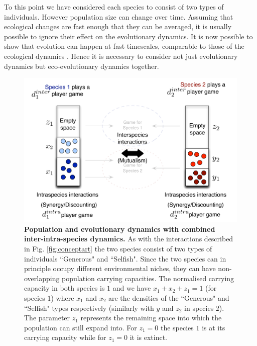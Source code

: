 \documentclass[12pt]{article}
\begin{document}
To this point we have considered each species to consist of two types of individuals. However population size can change over time. Assuming that ecological changes are fast enough that they can be averaged, it is usually possible to ignore their effect on the evolutionary dynamics. It is now possible to show that evolution can happen at fast timescales, comparable to those of the ecological dynamics \citep{post:PTRSB:2009,beaumont:Nature:2009,hanski:PNAS:2011,sanchez:PLoSB:2013}. Hence it is necessary to consider not just evolutionary dynamics but eco-evolutionary dynamics together.

%
\begin{figure}
\begin{center}
\includegraphics[scale=0.5]{Figures/popdyninterintra.pdf}
\caption{\small{
\textbf{Population and evolutionary dynamics with combined inter-intra-species dynamics.}
As with the interactions described in Fig. \ref{fig:conceptart} the two species consist of two types of individuals ``Generous" and ``Selfish".
Since the two species can in principle occupy different environmental niches, they  can have non-overlapping population carrying capacities.
The normalised carrying capacity in both species is $1$ and we have $x_1 + x_2 + z_1 = 1$ (for species $1$) where $x_1$ and $x_2$ are the densities of the ``Generous" and ``Selfish" types respectively (similarly with $y$ and $z_2$ in species $2$). 
The parameter $z_1$ represents the remaining space into which the population can still expand into.
For $z_1 = 0$ the species $1$ is at its carrying capacity while for $z_1 = 0$ it is extinct.}
\label{fig:conceptartpopdyn}
}
\end{center}
\end{figure}
%
\end{document}
